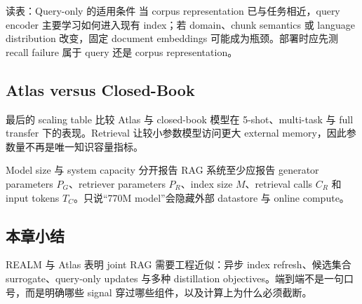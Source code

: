 
\begin{knowledgebox}{读表：Query-only 的适用条件}
当 corpus representation 已与任务相近，query encoder 主要学习如何进入现有 index；若 domain、chunk semantics 或 language distribution 改变，固定 document embeddings 可能成为瓶颈。部署时应先测 recall failure 属于 query 还是 corpus representation。
\end{knowledgebox}


\subsection{Atlas versus Closed-Book}

最后的 scaling table 比较 Atlas 与 closed-book 模型在 5-shot、multi-task 与 full transfer 下的表现。Retrieval 让较小参数模型访问更大 external memory，因此参数量不再是唯一知识容量指标。


\begin{importantbox}{Model size 与 system capacity 分开报告}
RAG 系统至少应报告 generator parameters $P_G$、retriever parameters $P_R$、index size $M$、retrieval calls $C_R$ 和 input tokens $T_C$。只说“770M model”会隐藏外部 datastore 与 online compute。
\end{importantbox}

\subsection{本章小结}

REALM 与 Atlas 表明 joint RAG 需要工程近似：异步 index refresh、候选集合 surrogate、query-only updates 与多种 distillation objectives。端到端不是一句口号，而是明确哪些 signal 穿过哪些组件，以及计算上为什么必须截断。

